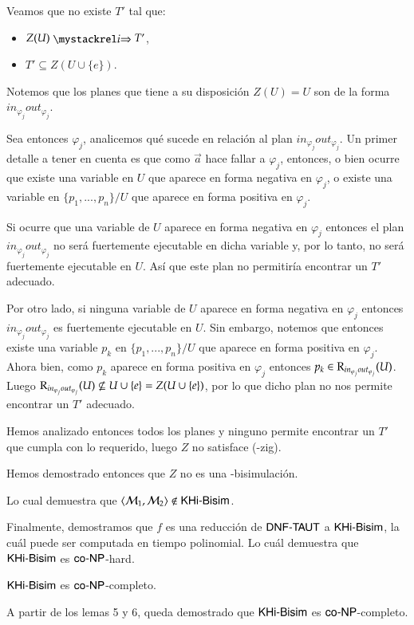 \begin{demostracion}
\begin{itemize}
    Veamos que no existe $T'$ tal que:

    \begin{multicols}{2}
        \begin{itemize}
            \item $Z(U) \ultsExecAgi T'$, 
            \item $T' \subseteq Z(U \cup \{e\})$.
        \end{itemize}
    \end{multicols}

    Notemos que los planes que tiene a su disposición $Z(U) = U$ son de la forma $in_{\varphi_j}out_{\varphi_j}$.

    Sea entonces $\varphi_j$, analicemos qué sucede en relación al plan $in_{\varphi_j}out_{\varphi_j}$. Un primer detalle a tener en cuenta es que como $\overrightarrow{a}$ hace fallar a $\varphi_j$, entonces, o bien ocurre que existe una variable en $U$ que aparece en forma negativa en $\varphi_j$, o existe una variable en $\{p_1,...,p_n\}/U$ que aparece en forma positiva en $\varphi_j$.

    Si ocurre que una variable de $U$ aparece en forma negativa en $\varphi_j$ entonces el plan $in_{\varphi_j}out_{\varphi_j}$ no será fuertemente ejecutable en dicha variable y, por lo tanto, no será fuertemente ejecutable en $U$. Así que este plan no permitiría encontrar un $T'$ adecuado.

    Por otro lado, si ninguna variable de $U$ aparece en forma negativa en $\varphi_j$ entonces $in_{\varphi_j}out_{\varphi_j}$ es fuertemente ejecutable en $U$. Sin embargo, notemos que entonces existe una variable $p_k$ en $\{p_1,...,p_n\}/U$ que aparece en forma positiva en $\varphi_j$. Ahora bien, como $p_k$ aparece en forma positiva en $\varphi_j$ entonces $p_k \in \mathrm{R}_{in_{\varphi_j}out_{\varphi_j}}(U)$. Luego $\mathrm{R}_{in_{\varphi_j}out_{\varphi_j}}(U) \not \subseteq U \cup \{e\} = Z(U \cup \{e\})$, por lo que dicho plan no nos permite encontrar un $T'$ adecuado.
    
    Hemos analizado entonces todos los planes y ninguno permite encontrar un $T'$ que cumpla con lo requerido, luego $Z$ no satisface (\KHilogic-zig).

    Hemos demostrado entonces que $Z$ no es una \KHilogic-bisimulación.

    Lo cual demuestra que $\langle \mathcal{M}_1,\mathcal{M}_2 \rangle \not \in \rm\textsf{KHi-Bisim}$.
    \end{itemize}

     Finalmente, demostramos que $f$ es una reducción de $\rm\textsf{DNF-TAUT}$ a $\rm\textsf{KHi-Bisim}$, la cuál puede ser computada en tiempo polinomial. Lo cuál demuestra que $\rm\textsf{KHi-Bisim}$ es $\rm\textsf{co-NP}$-hard.

\end{demostracion}


\begin{teorema}
    $\rm\textsf{KHi-Bisim}$ es $\rm\textsf{co-NP}$-completo.
\end{teorema}


\begin{demostracion}

    A partir de los lemas 5 y 6, queda demostrado que $\rm\textsf{KHi-Bisim}$ es $\rm\textsf{co-NP}$-completo.

\end{demostracion}
